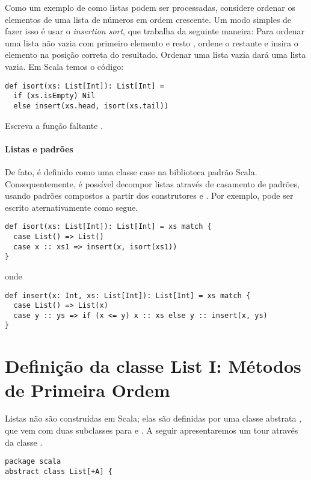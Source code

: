 Como um exemplo de como listas podem ser processadas, considere ordenar os elementos 
de uma lista de números em ordem crescente. Um modo simples de fazer isso é usar o 
{\em insertion sort}, que trabalha da seguinte maneira: Para ordenar uma lista não 
vazia com primeiro elemento  e resto , ordene o restante  e 
insira o elemento  na posição correta do resultado. Ordenar uma lista vazia dará
uma lista vazia. Em Scala temos o código:
\begin{lstlisting}
def isort(xs: List[Int]): List[Int] =
  if (xs.isEmpty) Nil
  else insert(xs.head, isort(xs.tail))
\end{lstlisting}

\begin{exercise} Escreva a função faltante .
\end{exercise}

\paragraph{Listas e padrões} De fato, \code{::} é definido como uma 
classe case na biblioteca padrão Scala. Consequentemente, é possível 
decompor listas através de casamento de padrões, usando padrões compostos
a partir dos construtores   e \code{::}. Por exemplo, 
pode ser escrito aternativamente como segue.
\begin{lstlisting}
def isort(xs: List[Int]): List[Int] = xs match {
  case List() => List()
  case x :: xs1 => insert(x, isort(xs1))
}
\end{lstlisting}
onde
\begin{lstlisting}
def insert(x: Int, xs: List[Int]): List[Int] = xs match {
  case List() => List(x)
  case y :: ys => if (x <= y) x :: xs else y :: insert(x, ys)
}
\end{lstlisting}

\section{Definição da classe List I: Métodos de Primeira Ordem}
\label{sec:list-first-order}

Listas não são construídas em Scala; elas são definidas por uma classe abstrata
, que vem com duas subclasses para \code{::} e . A seguir
apresentaremos um tour através da classe .

\begin{lstlisting}
package scala
abstract class List[+A] {
\end{lstlisting}

